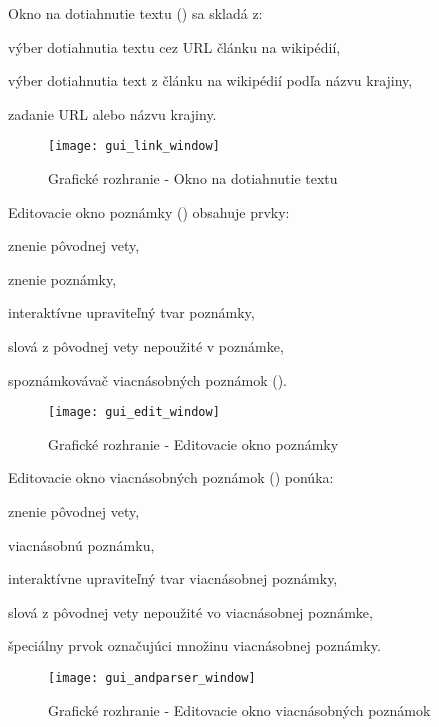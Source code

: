 Okno na dotiahnutie textu () sa skladá z:
\begin{my_enumerate}
	\item výber dotiahnutia textu cez URL článku na wikipédií,
	\item výber dotiahnutia text z článku na wikipédií podľa názvu krajiny,
	\item zadanie URL alebo názvu krajiny.
\end{my_enumerate}
\begin{figure}[H]
	\begin{center}\texttt{[image: gui\_link\_window]}\end{center}
	\caption[Grafické rozhranie - Okno na dotiahnutie textu]{Grafické rozhranie - Okno na dotiahnutie textu}\label{appendix:gui:link_window}
\end{figure}

Editovacie okno poznámky () obsahuje prvky:
\begin{my_enumerate}
	\item znenie pôvodnej vety,
	\item znenie poznámky,
	\item interaktívne upraviteľný tvar poznámky,
	\item slová z pôvodnej vety nepoužité v poznámke,
	\item spoznámkovávač viacnásobných poznámok ().
\end{my_enumerate}
\begin{figure}[H]
	\begin{center}\texttt{[image: gui\_edit\_window]}\end{center}
	\caption[Grafické rozhranie - Editovacie okno poznámky]{Grafické rozhranie - Editovacie okno poznámky}\label{appendix:gui:edit_window}
\end{figure}

Editovacie okno viacnásobných poznámok () ponúka:
\begin{my_enumerate}
	\item znenie pôvodnej vety,
	\item viacnásobnú poznámku,
	\item interaktívne upraviteľný tvar viacnásobnej poznámky,
	\item slová z pôvodnej vety nepoužité vo viacnásobnej poznámke,
	\item špeciálny prvok označujúci množinu viacnásobnej poznámky.
\end{my_enumerate}
\begin{figure}[H]
	\begin{center}\texttt{[image: gui\_andparser\_window]}\end{center}
	\caption[Grafické rozhranie - Editovacie okno viacnásobných poznámok]{Grafické rozhranie - Editovacie okno viacnásobných poznámok}\label{appendix:gui:andparser_window}
\end{figure}

